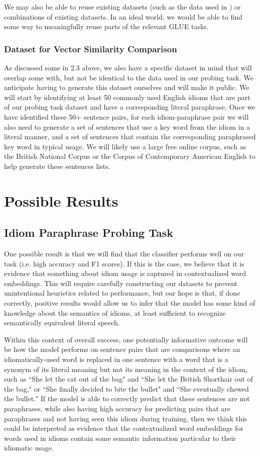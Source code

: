 \documentclass[11pt,a4paper]{article}
\begin{document}
We may also be able to reuse existing datasets (such as the data used in \citet{bizzoni-lappin-2018-predicting}) or combinations of existing datasets. In an ideal world, we would be able to find some way to meaningfully reuse parts of the relevant GLUE tasks. 
\subsubsection{Dataset for Vector Similarity Comparison}
As discussed some in 2.3 above, we also have a specific dataset in mind that will overlap some with, but not be identical to the data used in our probing task. We anticipate having to generate this dataset ourselves and will make it public. We will start by identifying at least 50 commonly used English idioms that are part of our probing task dataset and have a corresponding literal paraphrase. Once we have identified these 50+ sentence pairs, for each idiom-paraphrase pair we will also need to generate a set of sentences that use a key word from the idiom in a literal manner, and a set of sentences that contain the corresponding paraphrased key word in typical usage. We will likely use a large free online corpus, such as the British National Corpus or the Corpus of Contemporary American English to help generate these sentences lists.
\section{Possible Results}
\subsection{Idiom Paraphrase Probing Task}
One possible result is that we will find that the classifier performs well on our task (i.e. high accuracy and F1 scores). If this is the case, we believe that it is evidence that something about idiom usage is captured in contextualized word embeddings. This will require carefully constructing our datasets to prevent unintentional heuristics related to performance, but our hope is that, if done correctly, positive results would allow us to infer that the model has some kind of knowledge about the semantics of idioms, at least sufficient to recognize semantically equivalent literal speech.

Within this context of overall success, one potentially informative outcome will be how the model performs on sentence pairs that are comparisons where an idiomatically-used word is replaced in one sentence with a word that is a synonym of its literal meaning but not its meaning in the context of the idiom, such as ``She let the cat out of the bag" and ``She let the British Shorthair out of the bag," or  ``She finally decided to bite the bullet" and ``She eventually chewed the bullet." If the model is able to correctly predict that these sentences are not paraphrases, while also having high accuracy for predicting pairs that are paraphrases and not having seen this idiom during training, then we think this could be interpreted as evidence that the contextualized word embeddings for words used in idioms contain some semantic information particular to their idiomatic usage.
\end{document}
